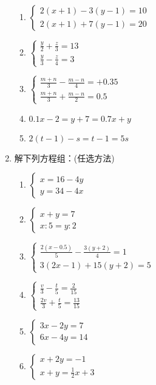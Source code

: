 \begin{enumerate}
\begin{multicols}{2}
\begin{enumerate}
        \item $\begin{cases}
            2(x+1)-3(y-1)=10\\ 2(x+1)+7(y-1)=20
        \end{cases}$
        \item $\begin{cases}
            \frac{y}{2}+\frac{z}{3}=13\\ \frac{y}{3}-\frac{z}{4}=3
        \end{cases}$
        \item $\begin{cases}
            \frac{m+n}{3}-\frac{m-n}{4}=+0.35\\ \frac{m+n}{3}+\frac{m-n}{2}=0.5
        \end{cases}$
        \item $0.1x-2=y+7=0.7x+y$
        \item $2(t-1)-s=t-1=5s$
    \end{enumerate}
\end{multicols}

\item 解下列方程组：(任选方法)
\begin{multicols}{2}
    \begin{enumerate}
\item $\begin{cases}
x=16-4y\\ y=34-4x
\end{cases}$
\item $\begin{cases}
x+y=7\\x:5=y:2
\end{cases}$
\item $\begin{cases}
\frac{2(x-0.5)}{5}-\frac{3(y+2)}{4}=1\\
3(2x-1)+15(y+2)=5
\end{cases}$
\item $\begin{cases}
\frac{v}{3}-\frac{t}{5}=\frac{2}{15}\\
\frac{2v}{3}+\frac{t}{5}=\frac{13}{15}
\end{cases}$
\item $\begin{cases}
3x-2y=7\\ 6x-4y=14
\end{cases}$
\item $\begin{cases}
x+2y=-1\\ x+y=\frac{1}{2}x+3
\end{cases}$
    \end{enumerate}
\end{multicols}


\end{enumerate}
